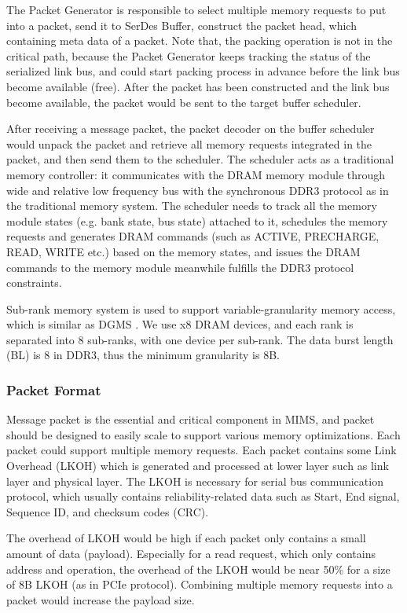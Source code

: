 \documentclass[pageno]{jpaper}
\begin{document}
The Packet Generator is responsible to select multiple memory requests to put into a packet, send it to SerDes Buffer, construct the packet head, which containing meta data of a packet. Note that, the packing operation is not in the critical path, because the Packet Generator keeps tracking the status of the serialized link bus, and could start packing process in advance before the link bus become available (free). After the packet has been constructed and the link bus become available, the packet would be sent to the target buffer scheduler.



After receiving a message packet, the packet decoder on the buffer scheduler would unpack the packet and retrieve all memory requests integrated in the packet, and then send them to the scheduler. The scheduler acts as a traditional memory controller: it communicates with the DRAM memory module through wide and relative low frequency bus with the synchronous DDR3 protocol as in the traditional memory system. The scheduler needs to track all the memory module states (e.g. bank state, bus state) attached to it, schedules the memory requests and generates DRAM commands (such as ACTIVE, PRECHARGE, READ, WRITE etc.) based on the memory states, and issues the DRAM commands to the memory module meanwhile fulfills the DDR3 protocol constraints.

Sub-rank memory system is used to support variable-granularity memory access, which is similar as DGMS \cite{DGMS}. We use x8 DRAM devices, and each rank is separated into 8 sub-ranks, with one device per sub-rank. The data burst length (BL) is 8 in DDR3, thus the minimum granularity is 8B.



\subsubsection {Packet Format}

Message packet is the essential and critical component in MIMS, and packet should be designed to easily scale to support various memory optimizations. Each packet could support multiple memory requests. Each packet contains some Link Overhead (LKOH) which is generated and processed at lower layer such as link layer and physical layer. The LKOH is necessary for serial bus communication protocol, which usually contains reliability-related data such as Start, End signal, Sequence ID, and checksum codes (CRC).

The overhead of LKOH would be high if each packet only contains a small amount of data (payload). Especially for a read request, which only contains address and operation, the overhead of the LKOH would be near 50\% for a size of 8B LKOH (as in PCIe protocol). Combining multiple memory requests into a packet would increase the payload size.
\end{document}
